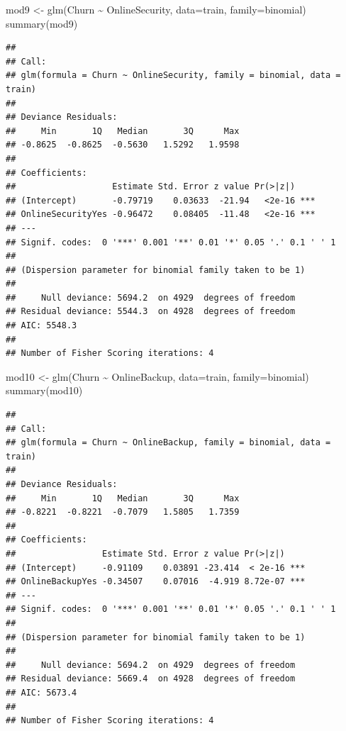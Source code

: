 \documentclass[
  twoside]{article}
\newenvironment{Shaded}{\begin{snugshade}}{\end{snugshade}}
\newcommand{\AttributeTok}[1]{\textcolor[rgb]{0.77,0.63,0.00}{#1}}
\newcommand{\FunctionTok}[1]{\textcolor[rgb]{0.00,0.00,0.00}{#1}}
\newcommand{\NormalTok}[1]{#1}
\newcommand{\OtherTok}[1]{\textcolor[rgb]{0.56,0.35,0.01}{#1}}
\newcommand{\SpecialCharTok}[1]{\textcolor[rgb]{0.00,0.00,0.00}{#1}}
\begin{document}
\begin{Shaded}
\begin{Highlighting}[]
\NormalTok{mod9 }\OtherTok{\textless{}{-}} \FunctionTok{glm}\NormalTok{(Churn }\SpecialCharTok{\textasciitilde{}}\NormalTok{ OnlineSecurity, }\AttributeTok{data=}\NormalTok{train, }\AttributeTok{family=}\NormalTok{binomial)}
\FunctionTok{summary}\NormalTok{(mod9)}
\end{Highlighting}
\end{Shaded}

\begin{verbatim}
## 
## Call:
## glm(formula = Churn ~ OnlineSecurity, family = binomial, data = train)
## 
## Deviance Residuals: 
##     Min       1Q   Median       3Q      Max  
## -0.8625  -0.8625  -0.5630   1.5292   1.9598  
## 
## Coefficients:
##                   Estimate Std. Error z value Pr(>|z|)    
## (Intercept)       -0.79719    0.03633  -21.94   <2e-16 ***
## OnlineSecurityYes -0.96472    0.08405  -11.48   <2e-16 ***
## ---
## Signif. codes:  0 '***' 0.001 '**' 0.01 '*' 0.05 '.' 0.1 ' ' 1
## 
## (Dispersion parameter for binomial family taken to be 1)
## 
##     Null deviance: 5694.2  on 4929  degrees of freedom
## Residual deviance: 5544.3  on 4928  degrees of freedom
## AIC: 5548.3
## 
## Number of Fisher Scoring iterations: 4
\end{verbatim}

\begin{Shaded}
\begin{Highlighting}[]
\NormalTok{mod10 }\OtherTok{\textless{}{-}} \FunctionTok{glm}\NormalTok{(Churn }\SpecialCharTok{\textasciitilde{}}\NormalTok{ OnlineBackup, }\AttributeTok{data=}\NormalTok{train, }\AttributeTok{family=}\NormalTok{binomial)}
\FunctionTok{summary}\NormalTok{(mod10)}
\end{Highlighting}
\end{Shaded}

\begin{verbatim}
## 
## Call:
## glm(formula = Churn ~ OnlineBackup, family = binomial, data = train)
## 
## Deviance Residuals: 
##     Min       1Q   Median       3Q      Max  
## -0.8221  -0.8221  -0.7079   1.5805   1.7359  
## 
## Coefficients:
##                 Estimate Std. Error z value Pr(>|z|)    
## (Intercept)     -0.91109    0.03891 -23.414  < 2e-16 ***
## OnlineBackupYes -0.34507    0.07016  -4.919 8.72e-07 ***
## ---
## Signif. codes:  0 '***' 0.001 '**' 0.01 '*' 0.05 '.' 0.1 ' ' 1
## 
## (Dispersion parameter for binomial family taken to be 1)
## 
##     Null deviance: 5694.2  on 4929  degrees of freedom
## Residual deviance: 5669.4  on 4928  degrees of freedom
## AIC: 5673.4
## 
## Number of Fisher Scoring iterations: 4
\end{verbatim}
\end{document}
